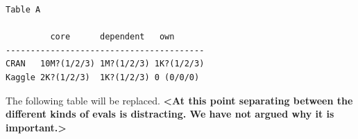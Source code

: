 \documentclass[conference]{IEEEtran}
\begin{document}
\begin{verbatim}
Table A

         core      dependent   own
----------------------------------------
CRAN   10M?(1/2/3) 1M?(1/2/3) 1K?(1/2/3)
Kaggle 2K?(1/2/3)  1K?(1/2/3) 0 (0/0/0)
\end{verbatim}




The following table will be replaced. {\bf <At this point separating between
  the different kinds of evals is distracting. We have not argued why it is
  important.>}

\begin{table}[ht]
  \label{table:eval-count-summary}
  \caption{Distribution of eval calls and callsites in the corpus}
\end{table}
\end{document}
